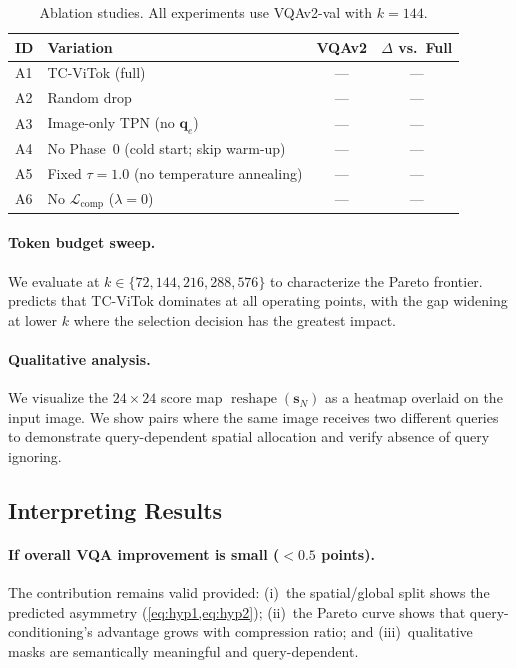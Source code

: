\documentclass[11pt,a4paper]{article}
\DeclareMathOperator{\reshape}{reshape}
\newcommand{\vq}{\mathbf{q}}
\newcommand{\vs}{\mathbf{s}}
\begin{document}
\begin{table}[t]
\centering
\caption{Ablation studies. All experiments use VQAv2-val with $k{=}144$.}
\label{tab:ablations}
\renewcommand{\arraystretch}{1.15}
\begin{tabular}{@{}llcc@{}}
  \toprule
  ID & Variation & VQAv2 & $\Delta$ vs.\ Full \\
  \midrule
  A1 & TC-ViTok (full)                             & --- & --- \\
  A2 & Random drop                                 & --- & --- \\
  A3 & Image-only TPN (no $\vq_e$)                 & --- & --- \\
  A4 & No Phase~0 (cold start; skip warm-up)       & --- & --- \\
  A5 & Fixed $\tau{=}1.0$ (no temperature annealing) & --- & --- \\
  A6 & No $\mathcal{L}_{\mathrm{comp}}$ ($\lambda{=}0$)
       & --- & --- \\
  \bottomrule
\end{tabular}
\end{table}

\paragraph{Token budget sweep.}
We evaluate at $k\in\{72,144,216,288,576\}$ to characterize the Pareto frontier.
 predicts that TC-ViTok dominates at all operating points, with
the gap widening at lower $k$ where the selection decision has the greatest impact.

\paragraph{Qualitative analysis.}
We visualize the $24{\times}24$ score map $\reshape(\vs_N)$ as a heatmap
overlaid on the input image. We show pairs where the same image receives two
different queries to demonstrate query-dependent spatial allocation and verify
absence of query ignoring.

\subsection{Interpreting Results}
\label{subsec:interpret}

\paragraph{If overall VQA improvement is small ($<0.5$ points).}
The contribution remains valid provided: (i)~the spatial/global split shows the
predicted asymmetry (\cref{eq:hyp1,eq:hyp2}); (ii)~the Pareto curve shows that
query-conditioning's advantage grows with compression ratio; and (iii)~qualitative
masks are semantically meaningful and query-dependent.
\end{document}
